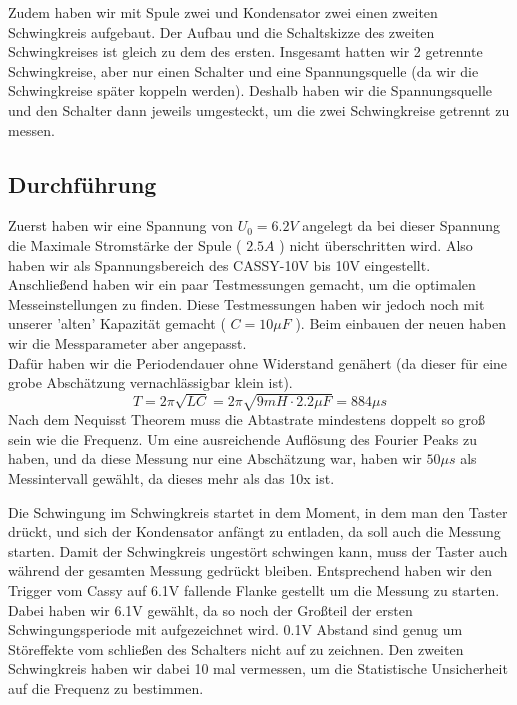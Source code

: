 \documentclass[twoside]{protokoll}
\begin{document}
Zudem haben wir mit Spule zwei und Kondensator zwei einen zweiten Schwingkreis aufgebaut.
Der Aufbau und die Schaltskizze des zweiten Schwingkreises ist gleich zu dem des ersten.
Insgesamt hatten wir 2 getrennte Schwingkreise, aber nur einen Schalter und eine Spannungsquelle (da wir die Schwingkreise später koppeln werden).
Deshalb haben wir die Spannungsquelle und den Schalter dann jeweils umgesteckt, um die zwei Schwingkreise getrennt zu messen.




\subsection{Durchführung}
Zuerst haben wir eine Spannung von $U_0 = 6.2V$ angelegt da bei dieser Spannung die Maximale Stromstärke der Spule ( $2.5A$ ) nicht überschritten wird.
Also haben wir als Spannungsbereich des CASSY-10V bis 10V eingestellt.
Anschließend haben wir ein paar Testmessungen gemacht, um die optimalen Messeinstellungen zu finden.
Diese Testmessungen haben wir jedoch noch mit unserer 'alten' Kapazität gemacht ( $C = 10 \mu F$ ).
Beim einbauen der neuen haben wir die Messparameter aber angepasst.\\
Dafür haben wir die Periodendauer ohne Widerstand genähert (da dieser für eine grobe Abschätzung vernachlässigbar klein ist).
\begin{equation}
    T = 2 \pi \sqrt{LC} = 2 \pi \sqrt{9mH \cdot 2.2 \mu F} = 884 \mu s
\end{equation}
Nach dem Nequisst Theorem muss die Abtastrate mindestens doppelt so groß sein wie die Frequenz.
Um eine ausreichende Auflösung des Fourier Peaks zu haben, und da diese Messung nur eine Abschätzung war, haben wir $ 50 \mu s $ als Messintervall gewählt, da dieses mehr als das 10x ist.

 
Die Schwingung im Schwingkreis startet in dem Moment, in dem man den Taster drückt, und sich der Kondensator anfängt zu entladen, da soll auch die Messung starten.
Damit der Schwingkreis ungestört schwingen kann, muss der Taster auch während der gesamten Messung gedrückt bleiben.
Entsprechend haben wir den Trigger vom Cassy auf 6.1V fallende Flanke gestellt um die Messung zu starten.
Dabei haben wir 6.1V gewählt, da so noch der Großteil der ersten Schwingungsperiode mit aufgezeichnet wird.
0.1V Abstand sind genug um Störeffekte vom schließen des Schalters nicht auf zu zeichnen.
Den zweiten Schwingkreis haben wir dabei 10 mal vermessen, um die Statistische Unsicherheit auf die Frequenz zu bestimmen.
\end{document}
